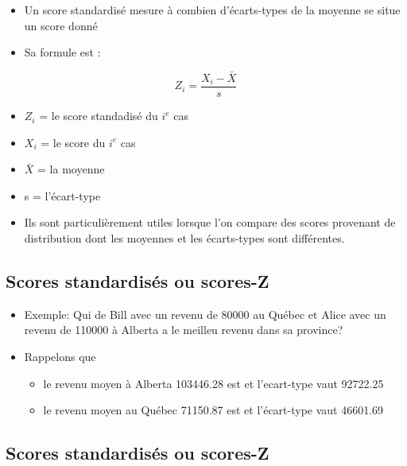\documentclass[
]{article}
\providecommand{\tightlist}{%
  \setlength{\itemsep}{0pt}\setlength{\parskip}{0pt}}
\begin{document}
\begin{itemize}
\tightlist
\item
  Un score standardisé mesure à combien d'écarts-types de la moyenne se
  situe un score donné
\item
  Sa formule est :
\end{itemize}

\[Z_i = \frac{X_i - \bar{X}}{s}\]

\begin{itemize}
\item
  \(Z_i\) = le score standadisé du \(i^e\) cas
\item
  \(X_i\) = le score du \(i^e\) cas
\item
  \(\bar{X}\) = la moyenne
\item
  s = l'écart-type
\item
  Ils sont particulièrement utiles lorsque l'on compare des scores
  provenant de distribution dont les moyennes et les écarts-types sont
  différentes.
\end{itemize}

\hypertarget{scores-standardisuxe9s-ou-scores-z-1}{%
\subsection{Scores standardisés ou
scores-Z}\label{scores-standardisuxe9s-ou-scores-z-1}}

\begin{itemize}
\item
  Exemple: Qui de Bill avec un revenu de 80000 au Québec et Alice avec
  un revenu de 110000 à Alberta a le meilleu revenu dans sa province?
\item
  Rappelons que

  \begin{itemize}
  \tightlist
  \item
    le revenu moyen à Alberta 103446.28 est et l'ecart-type vaut
    92722.25
  \item
    le revenu moyen au Québec 71150.87 est et l'écart-type vaut 46601.69
  \end{itemize}
\end{itemize}

\hypertarget{scores-standardisuxe9s-ou-scores-z-2}{%
\subsection{Scores standardisés ou
scores-Z}\label{scores-standardisuxe9s-ou-scores-z-2}}
\end{document}
